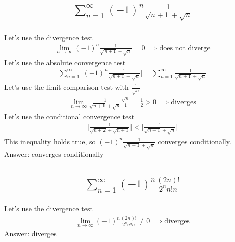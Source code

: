 \documentclass{article}
\begin{document}
\subsection{
	\begin{align*}
		\sum_{n = 1}^{\infty} (-1)^n \frac{1}{\sqrt{n +1} + \sqrt{n}}
	\end{align*}
}
Let's use the divergence test
\begin{align*}
	\lim_{n \to \infty} {(-1)^n \frac{1}{\sqrt{n +1} + \sqrt{n}}} = 0 \implies \text{does not diverge}
\end{align*}
Let's use the absolute convergence test
\begin{align*}
	\sum_{n = 1}^{\infty} \bigg| (-1)^n \frac{1}{\sqrt{n +1} + \sqrt{n}} \bigg| = \sum_{n = 1}^{\infty} \frac{1}{\sqrt{n +1} + \sqrt{n}}
\end{align*}
Let's use the limit comparison test with $\frac{1}{\sqrt{n}}$
\begin{align*}
	\lim_{n \to \infty} {\frac{1}{\sqrt{n +1} + \sqrt{n}} \frac{\sqrt{n}}{1}} = \frac{1}{2} > 0 \implies \text{diverges}
\end{align*}
Let's use the conditional convergence test
\begin{align*}
	\bigg| \frac{1}{\sqrt{n +2} + \sqrt{n + 1}} \bigg| < \bigg| \frac{1}{\sqrt{n +1} + \sqrt{n}} \bigg|
\end{align*}
This inequality holds true, so $(-1)^n \frac{1}{\sqrt{n +1} + \sqrt{n}}$ converges conditionally. \\[10pt]
Answer: converges conditionally

\subsection{
	\begin{align*}
		\sum_{n = 1}^{\infty} (-1)^n \frac{(2n)!}{2^n n! n}
	\end{align*}
}
Let's use the divergence test
\begin{align*}
	\lim_{n \to \infty} (-1)^n \frac{(2n)!}{2^n n! n} \neq 0 \implies \text{diverges}
\end{align*}
Answer: diverges

\end{document}
